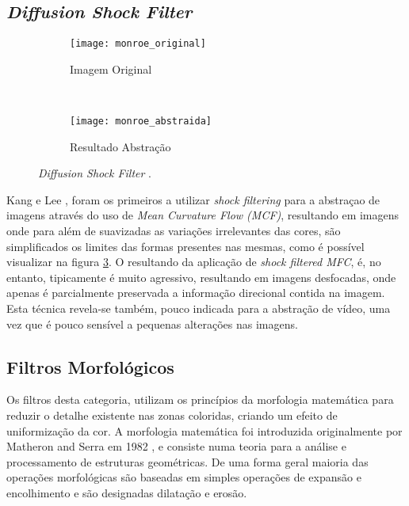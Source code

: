 \subsection{\textit{Diffusion Shock Filter}}
\begin{figure}
        \centering
        \begin{subfigure}[b]{0.3\textwidth}
                \centering
                \texttt{[image: monroe\_original]}
                \caption{Imagem Original}
                \label{fig:monroe_original}
        \end{subfigure}%
        ~ %
        \begin{subfigure}[b]{0.3\textwidth}
                \centering
                \texttt{[image: monroe\_abstraida]}
                \caption{Resultado Abstração}
                \label{fig:monroe_abstraida}
        \end{subfigure}
        \caption{\textit{Diffusion Shock Filter} \cite{Kang2008}.}\label{fig:diffusion_shock_filter}
\end{figure}
Kang e Lee \cite{Kang2008}, foram os primeiros a utilizar \textit{shock filtering} para a abstraçao de imagens através do uso de \textit{Mean Curvature Flow (MCF)}, resultando em imagens onde para além de suavizadas as variações irrelevantes das cores, são simplificados os limites das formas presentes nas mesmas, como é possível visualizar na figura \ref{fig:diffusion_shock_filter}. O resultando da aplicação de \textit{shock filtered MFC}, é, no entanto, tipicamente é muito agressivo, resultando em imagens desfocadas, onde apenas é parcialmente preservada a  informação direcional contida na imagem. Esta técnica revela-se também, pouco indicada para a abstração de vídeo, uma vez que é pouco sensível a pequenas alterações nas imagens.

\subsection{Filtros Morfológicos}
Os filtros desta categoria, utilizam os princípios da morfologia matemática para reduzir o detalhe existente nas zonas coloridas, criando um efeito de uniformização da cor. A morfologia matemática foi introduzida originalmente por Matheron and Serra em 1982 \cite{serra1982image}, e consiste numa teoria para a análise e processamento de estruturas geométricas. De uma forma geral maioria das operações morfológicas são baseadas em simples operações de expansão e encolhimento e são designadas dilatação e erosão.

